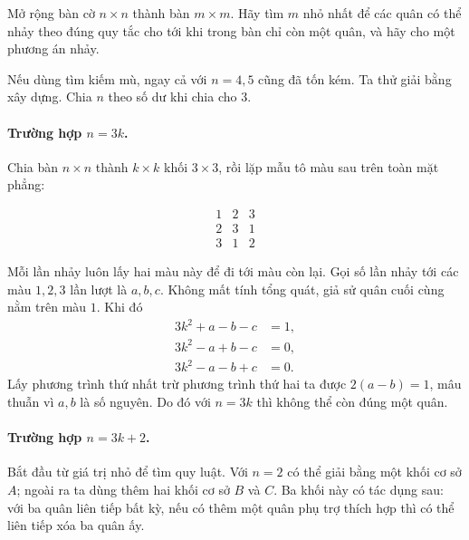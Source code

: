 \documentclass[11pt]{article}
\begin{document}
Mở rộng bàn cờ $n\times n$ thành bàn $m\times m$. Hãy tìm $m$ nhỏ nhất để các
quân có thể nhảy theo đúng quy tắc cho tới khi trong bàn chỉ còn một quân, và
hãy cho một phương án nhảy.

Nếu dùng tìm kiếm mù, ngay cả với $n=4,5$ cũng đã tốn kém. Ta thử giải bằng
xây dựng. Chia $n$ theo số dư khi chia cho $3$.

\paragraph{Trường hợp $n=3k$.}
Chia bàn $n\times n$ thành $k\times k$ khối $3\times 3$, rồi lặp mẫu tô màu
sau trên toàn mặt phẳng:

\[
\begin{array}{ccc}
1&2&3\\
2&3&1\\
3&1&2
\end{array}
\]

Mỗi lần nhảy luôn lấy hai màu này để đi tới màu còn lại. Gọi số lần nhảy tới
các màu $1,2,3$ lần lượt là $a,b,c$. Không mất tính tổng quát, giả sử quân
cuối cùng nằm trên màu $1$. Khi đó
\[
\begin{aligned}
3k^2+a-b-c &= 1,\\
3k^2-a+b-c &= 0,\\
3k^2-a-b+c &= 0.
\end{aligned}
\]
Lấy phương trình thứ nhất trừ phương trình thứ hai ta được
$2(a-b)=1$, mâu thuẫn vì $a,b$ là số nguyên. Do đó với $n=3k$ thì không thể
còn đúng một quân.

\paragraph{Trường hợp $n=3k+2$.}
Bắt đầu từ giá trị nhỏ để tìm quy luật. Với $n=2$ có thể giải bằng một khối
cơ sở $A$; ngoài ra ta dùng thêm hai khối cơ sở $B$ và $C$. Ba khối này có
tác dụng sau: với ba quân liên tiếp bất kỳ, nếu có thêm một quân phụ trợ thích
hợp thì có thể liên tiếp xóa ba quân ấy.

\begin{center}
\end{center}
\end{document}
